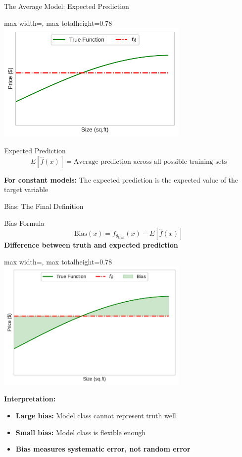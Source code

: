 \documentclass[10pt]{beamer}
\newcommand{\fitpic}[1]{\begin{adjustbox}{max width=\linewidth, max totalheight=0.78\textheight}#1\end{adjustbox}}
\begin{document}
\begin{frame}{The Average Model: Expected Prediction}
\begin{center}
\fitpic{\includegraphics[width=0.7\textwidth]{../assets/bias-variance/figures/bias5.pdf}}
\end{center}

\begin{definitionbox}{Expected Prediction}
$$E[\hat{f}(x)] = \text{Average prediction across all possible training sets}$$
\end{definitionbox}

\begin{keypointsbox}
\textbf{For constant models:} The expected prediction is the expected value of the target variable
\end{keypointsbox}
\end{frame}

\begin{frame}{Bias: The Final Definition}
\begin{definitionbox}{Bias Formula}
$$\text{Bias}(x) = f_{\theta_{\text{true}}}(x) - E[\hat{f}(x)]$$
\textbf{Difference between truth and expected prediction}
\end{definitionbox}

\begin{center}
\fitpic{\includegraphics[width=0.7\textwidth]{../assets/bias-variance/figures/bias6.pdf}}
\end{center}

\begin{keypointsbox}
\textbf{Interpretation:}
\begin{itemize}
\item \textbf{Large bias:} Model class cannot represent truth well
\item \textbf{Small bias:} Model class is flexible enough
\item \textbf{Bias measures systematic error, not random error}
\end{itemize}
\end{keypointsbox}
\end{frame}
\end{document}
